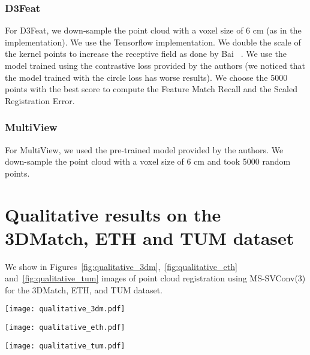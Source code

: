 \documentclass[10pt,twocolumn,letterpaper]{article}
\begin{document}
\subsubsection{D3Feat~\cite{bai2020d3feat}}
For D3Feat, we down-sample the point cloud with a voxel size of 6 cm (as in the implementation). We use the Tensorflow implementation. We double the scale of the kernel points to increase the receptive field as done by Bai \etal~\cite{bai2020d3feat}. We use the model trained using the contrastive loss provided by the authors (we noticed that the model trained with the circle loss has worse results). 
We choose the 5000 points with the best score to compute the Feature Match Recall and the Scaled Registration Error. 

\subsubsection{MultiView~\cite{Li_2020_CVPR}}
For MultiView, we used the pre-trained model provided by the authors. We down-sample the point cloud with a voxel size of 6 cm and took 5000 random points.



\section{Qualitative results on the 3DMatch, ETH and TUM dataset}

We show in Figures~\ref{fig:qualitative_3dm},~\ref{fig:qualitative_eth} and~\ref{fig:qualitative_tum} images of point cloud registration using MS-SVConv(3) for the 3DMatch, ETH, and TUM dataset.

\begin{figure*}[ht]
    \centering
    \texttt{[image: qualitative\_3dm.pdf]}
    \caption{Qualitative results on 3DMatch (supervised learning). We can see that even with few structure and low overlap, MS-SVConv(3) can find the transformation between the pair of scenes.}
    \label{fig:qualitative_3dm}
\end{figure*}


\begin{figure*}[ht]
    \centering
    \texttt{[image: qualitative\_eth.pdf]}
    \caption{Qualitative results on ETH dataset (model pre-trained on 3DMatch and fine-tuned with UDGE on ETH). The last line shows a failure of MS-SVConv(3). }
    \label{fig:qualitative_eth}
\end{figure*}



\begin{figure*}[ht]
    \centering
    \texttt{[image: qualitative\_tum.pdf]}
    \caption{Qualitative results on TUM dataset (model pre-trained on 3DMatch and fine-tuned with UDGE on TUM).}
    \label{fig:qualitative_tum}
\end{figure*}
\end{document}

